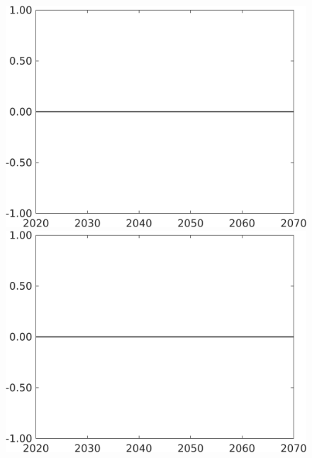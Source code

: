 \documentclass[12pt]{article}
\begin{document}
\begin{figure}[h!!]
\begin{minipage}[]{0.32\textwidth}
	\end{minipage}		
	\begin{minipage}[]{0.32\textwidth}
		\includegraphics[width=1\textwidth]{../../codding_model/own_basedOnFried/optimalPol_010922_revision/figures/all_13Sept22/CompTaufPER_bytaul_Reg0_gAg_spillover0_nsk0_xgr1_knspil0_sep1_LFlimit1_emsbase0_countec0_GovRev0_etaa0.79_lgd0.png}
	\end{minipage}
	\begin{minipage}[]{0.32\textwidth}
		\includegraphics[width=1\textwidth]{../../codding_model/own_basedOnFried/optimalPol_010922_revision/figures/all_13Sept22/CompTaufPER_bytaul_Reg0_gAn_spillover0_nsk0_xgr1_knspil0_sep1_LFlimit1_emsbase0_countec0_GovRev0_etaa0.79_lgd0.png}

\end{minipage}
\end{figure}
\end{document}
